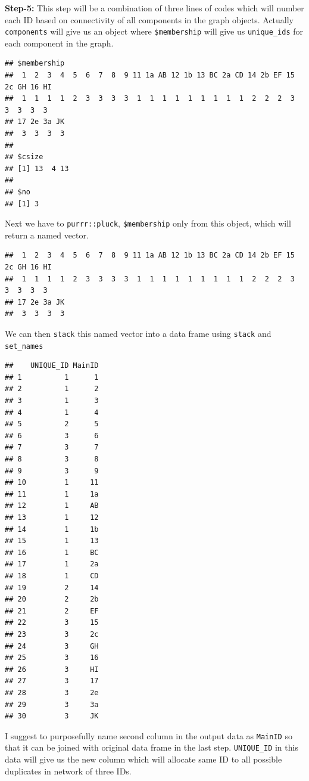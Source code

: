 \documentclass[
]{book}
\begin{document}
\textbf{Step-5:} This step will be a combination of three lines of codes which will number each ID based on connectivity of all components in the graph objects. Actually \texttt{components} will give us an object where \texttt{\$membership} will give us \texttt{unique\_ids} for each component in the graph.

\begin{verbatim}
## $membership
##  1  2  3  4  5  6  7  8  9 11 1a AB 12 1b 13 BC 2a CD 14 2b EF 15 2c GH 16 HI 
##  1  1  1  1  2  3  3  3  3  1  1  1  1  1  1  1  1  1  2  2  2  3  3  3  3  3 
## 17 2e 3a JK 
##  3  3  3  3 
## 
## $csize
## [1] 13  4 13
## 
## $no
## [1] 3
\end{verbatim}

Next we have to \texttt{purrr::pluck}, \texttt{\$membership} only from this object, which will return a named vector.

\begin{verbatim}
##  1  2  3  4  5  6  7  8  9 11 1a AB 12 1b 13 BC 2a CD 14 2b EF 15 2c GH 16 HI 
##  1  1  1  1  2  3  3  3  3  1  1  1  1  1  1  1  1  1  2  2  2  3  3  3  3  3 
## 17 2e 3a JK 
##  3  3  3  3
\end{verbatim}

We can then \texttt{stack} this named vector into a data frame using \texttt{stack} and \texttt{set\_names}

\begin{verbatim}
##    UNIQUE_ID MainID
## 1          1      1
## 2          1      2
## 3          1      3
## 4          1      4
## 5          2      5
## 6          3      6
## 7          3      7
## 8          3      8
## 9          3      9
## 10         1     11
## 11         1     1a
## 12         1     AB
## 13         1     12
## 14         1     1b
## 15         1     13
## 16         1     BC
## 17         1     2a
## 18         1     CD
## 19         2     14
## 20         2     2b
## 21         2     EF
## 22         3     15
## 23         3     2c
## 24         3     GH
## 25         3     16
## 26         3     HI
## 27         3     17
## 28         3     2e
## 29         3     3a
## 30         3     JK
\end{verbatim}

I suggest to purposefully name second column in the output data as \texttt{MainID} so that it can be joined with original data frame in the last step. \texttt{UNIQUE\_ID} in this data will give us the new column which will allocate same ID to all possible duplicates in network of three IDs.
\end{document}
